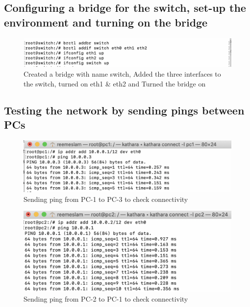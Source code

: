 \subsection{Configuring a bridge for the switch, set-up the environment and turning on the bridge}

\begin{figure}[H]
\centering
  \includegraphics[width=500pt]{Images/Task5.3.png}
  \caption{Created a bridge with name switch, Added the three interfaces to the switch, turned on eth1 \& eth2 and Turned the bridge on}
  \label{fig:3.7}
\end{figure}

\subsection{Testing the network by sending pings between PCs}

\begin{figure}[H]
\centering
  \includegraphics[width=500pt]{Images/Task5.4.1.png}
  \caption{Sending ping from PC-1 to PC-3 to check connectivity}
  \label{fig:3.8}
\end{figure}

\begin{figure}[H]
\centering
  \includegraphics[width=400pt]{Images/task5.4.2.png}
  \caption{Sending ping from PC-2 to PC-1 to check connectivity}
  \label{fig:3.9}
\end{figure}

